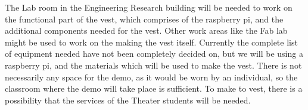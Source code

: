 The Lab room in the Engineering Research building will be needed to work on the functional part of the vest, which comprises of the raspberry pi, and the additional components needed for the vest. Other work areas like the Fab lab might be used to work on the making the vest itself. Currently the complete list of equipment needed have not been completely decided on, but we will be using a raspberry pi, and the materials which will be used to make the vest. There is not necessarily any space for the demo, as it would be worn by an individual, so the classroom where the demo will take place is sufficient. To make to vest, there is a possibility that the services of the Theater students will be needed. 
